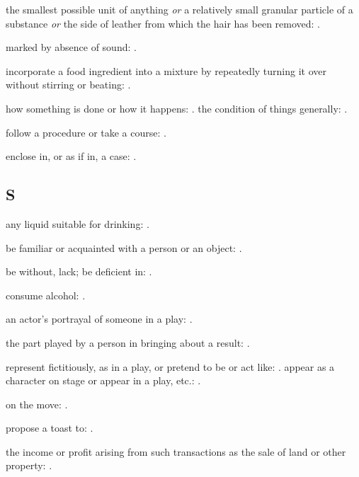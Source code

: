   the smallest possible unit of anything \textit{or} a relatively small granular particle of a substance \textit{or} the side of leather from which the hair has been removed: .

  marked by absence of sound:   .

  incorporate a food ingredient into a mixture by repeatedly turning it over without stirring or beating: .

  how something is done or how it happens:   . the condition of things generally: .

  follow a procedure or take a course:   .

  enclose in, or as if in, a case:   .

\subsection*{S}

  any liquid suitable for drinking:   .

  be familiar or acquainted with a person or an object: .

  be without, lack; be deficient in: .

  consume alcohol:   .

  an actor's portrayal of someone in a play:   .

  the part played by a person in bringing about a result:   .

  represent fictitiously, as in a play, or pretend to be or act like:   . appear as a character on stage or appear in a play, etc.: .

  on the move:   .

  propose a toast to:   .

  the income or profit arising from such transactions as the sale of land or other property:   .

